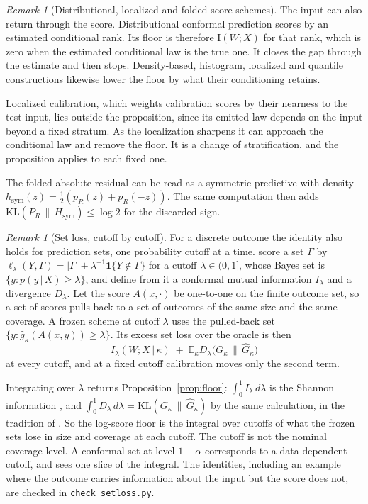 \documentclass[11pt]{article}
\theoremstyle{remark}
\newtheorem{remark}[proposition]{Remark}
\newcommand{\E}{\mathbb{E}}
\newcommand{\I}{\mathrm{I}}
\newcommand{\given}{\,|\,}
\newcommand{\KLop}{\mathrm{KL}}
\begin{document}
\begin{remark}[Distributional, localized and folded-score schemes]\label{rem:conditional}
The input can also return through the score. Distributional conformal prediction
\citep{chernozhukov2021distributional} scores by an estimated conditional rank. Its
floor is therefore $\I(W;X)$ for that rank, which is zero when the estimated
conditional law is the true one. It closes the gap through the estimate and then stops.
Density-based, histogram, localized and quantile constructions
\citep{izbicki2020,izbicki2022,sesia2021,guan2023localized,romano2019conformalized,cauchois2021}
likewise lower the floor by what their conditioning retains.

Localized calibration,
which weights calibration scores by their nearness to the test input, lies outside the
proposition, since its emitted law depends on the input beyond a fixed stratum. As the
localization sharpens it can approach the conditional law and remove the floor. It is a change of stratification, and the proposition applies to each fixed one.

The folded absolute residual can be read as a symmetric predictive
with density $h_{\mathrm{sym}}(z)=\tfrac12(p_R(z)+p_R(-z))$. The same computation then
adds $\KLop(P_R\,\|\,H_{\mathrm{sym}})\le\log 2$ for the discarded sign.
\end{remark}

\begin{remark}[Set loss, cutoff by cutoff]\label{rem:setloss}
For a discrete outcome the identity also holds for prediction sets, one probability cutoff at a
time. \citet{zhang2026} score a set $\Gamma$ by $\ell_\lambda(Y,\Gamma)=|\Gamma|+\lambda^{-1}\mathbf
1\{Y\notin\Gamma\}$ for a cutoff $\lambda\in(0,1]$, whose Bayes set is $\{y:p(y\given X)\ge\lambda\}$,
and define from it a conformal mutual information $I_\lambda$ and a divergence $D_\lambda$. Let the
score $A(x,\cdot)$ be one-to-one on the finite outcome set, so a set of scores pulls back to a set of
outcomes of the same size and the same coverage. A frozen scheme at cutoff $\lambda$ uses the pulled-back
set $\{y:\widehat g_\kappa(A(x,y))\ge\lambda\}$. Its excess set loss over the oracle is then
\[
I_\lambda(W;X\given\kappa)\;+\;\E_\kappa D_\lambda\big(G_\kappa\,\|\,\widehat G_\kappa\big)
\]
at every cutoff, and at a fixed cutoff calibration moves only the second term.

Integrating over
$\lambda$ returns Proposition~\ref{prop:floor}: $\int_0^1 I_\lambda\,d\lambda$ is the Shannon
information \citep[Theorem 1]{zhang2026}, and $\int_0^1 D_\lambda\,d\lambda=\KLop(G_\kappa\,\|\,\widehat
G_\kappa)$ by the same calculation, in the tradition of \citet{schervish1989}. So the log-score floor
is the integral over cutoffs of what the frozen sets lose in size and coverage at each cutoff. The
cutoff is not the nominal coverage level. A conformal set at level $1-\alpha$ corresponds to a
data-dependent cutoff, and sees one slice of the integral. The identities, including an example
where the outcome carries information about the input but the score does not, are checked in
\texttt{check\_setloss.py}.
\end{remark}
\end{document}
